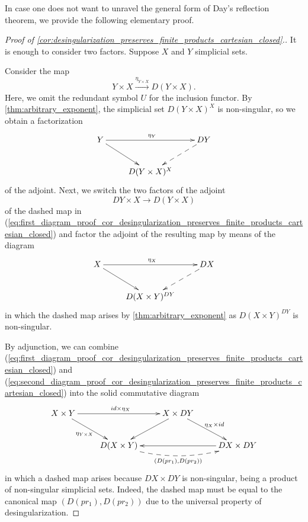 In case one does not want to unravel the general form of Day's reflection theorem, we provide the following elementary proof.
\begin{proof}[Proof of \cref{cor:desingularization_preserves_finite_products_cartesian_closed}.]
It is enough to consider two factors. Suppose $X$ and $Y$ simplicial sets.

Consider the map
\[Y\times X\xrightarrow{\eta _{Y\times X}} D(Y\times X).\]
Here, we omit the redundant symbol $U$ for the inclusion functor. By \cref{thm:arbitrary_exponent}, the simplicial set $D(Y\times X)^X$ is non-singular, so we obtain a factorization
\begin{equation}
\label{eq:first_diagram_proof_cor_desingularization_preserves_finite_products_cartesian_closed}
\begin{gathered}
\xymatrix{
Y \ar[dr] \ar[rr]^{\eta _Y} && DY \ar@{-->}[ld] \\
& D(Y\times X)^X
}
\end{gathered}
\end{equation}
of the adjoint. Next, we switch the two factors of the adjoint
\[DY\times X\to D(Y\times X)\]
of the dashed map in (\ref{eq:first_diagram_proof_cor_desingularization_preserves_finite_products_cartesian_closed}) and factor the adjoint of the resulting map by means of the diagram
\begin{equation}
\label{eq:second_diagram_proof_cor_desingularization_preserves_finite_products_cartesian_closed}
\begin{gathered}
\xymatrix{
X \ar[dr] \ar[rr]^{\eta _X} && DX \ar@{-->}[ld] \\
& D(X\times Y)^{DY}
}
\end{gathered}
\end{equation}
in which the dashed map arises by \cref{thm:arbitrary_exponent} as $D(X\times Y)^{DY}$ is non-singular.

By adjunction, we can combine (\ref{eq:first_diagram_proof_cor_desingularization_preserves_finite_products_cartesian_closed}) and (\ref{eq:second_diagram_proof_cor_desingularization_preserves_finite_products_cartesian_closed}) into the solid commutative diagram
\begin{equation}
\label{eq:third_diagram_proof_cor_desingularization_preserves_finite_products_cartesian_closed}
\begin{gathered}
\xymatrix{
X\times Y \ar[dr]_{\eta _{Y\times X}} \ar[rr]^{id\times \eta _X} && X\times DY \ar[ld] \ar[dr]^{\eta _X\times id} \\
& D(X\times Y) \ar@{-->}@/_1pc/[rr]_{(D(pr_1),D(pr_2))} && DX\times DY \ar[ll]
}
\end{gathered}
\end{equation}
in which a dashed map arises because $DX\times DY$ is non-singular, being a product of non-singular simplicial sets. Indeed, the dashed map must be equal to the canonical map $(D(pr_1),D(pr_2))$ due to the universal property of desingularization.


\end{proof}
